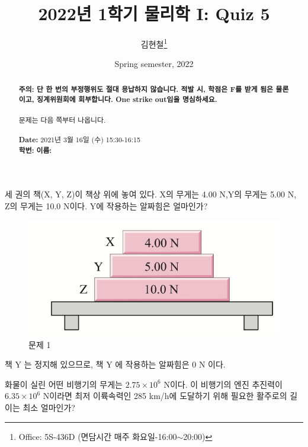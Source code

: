 \documentclass[floatfix,nofootinbib,superscriptaddress,fleqn,preprint]{revtex4}
\begin{document}
\title{\Large 2022년 1학기 물리학 I: Quiz 5}
\author{김현철\footnote{Office: 5S-436D (면담시간 매주
    화요일-16:00$\sim$20:00)}} 
\date{Spring semester, 2022}


\vspace{1.cm}
\begin{abstract}
\noindent \textbf{ {\color{red}주의}: \color{blue} 단 한 번의 부정행위도 절대
  용납하지 않습니다. 적발 시, 학점은 F를 받게 됨은 물론이고,
  징계위원회에 회부합니다. One strike out임을 명심하세요.}\\
\\
문제는 다음 쪽부터 나옵니다.  \\ \\
{\bf Date:} 2021년 3월 16일 (수) 15:30-16:15 
\\
{\bf 학번:} \hspace{4cm}
{\bf 이름:} 

\end{abstract}
\maketitle

세 권의 책(X, Y, Z)이 책상 위에 놓여 있다. X의
무게는 4.00 N,Y의 무게는 5.00 N, Z의 무게는 10.0 N이다. Y에 작용하는
알짜힘은 얼마인가? 
\begin{figure}[ht]
  \centering
\includegraphics[scale=0.6]{Qfig5-1.pdf}  
  \caption{문제 1}
  \label{fig:1}
\end{figure}

책 Y 는 정지해 있으므로, 책 Y 에 작용하는 알짜힘은 0 N 이다.

\vspace{2cm}

화물이 실린 어떤 비행기의 무게는 $2.75\times
10^6$ N이다. 이 비행기의 엔진 추진력이 $6.35\times10^6$ N이라면 최저
이륙속력인 285 km/h에 도달하기 위해 필요한 활주로의 길이는 최소
얼마인가?  \\
\end{document}

